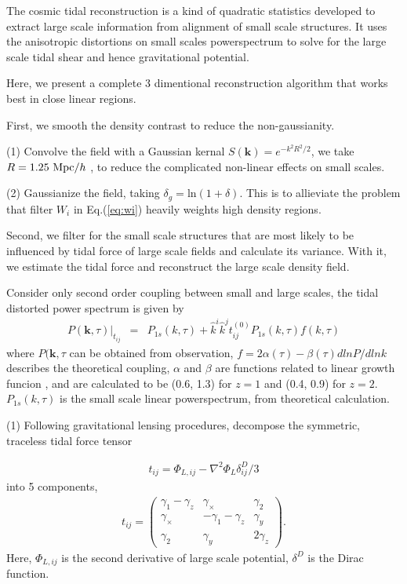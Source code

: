 The cosmic tidal reconstruction is a kind of quadratic statistics developed to extract large scale information from alignment of small scale structures.
It uses the anisotropic distortions on small scales powerspectrum to solve for the large scale tidal shear and hence gravitational potential.

Here, we present a complete 3 dimentional reconstruction algorithm that works best in close linear regions.

First, we smooth the density contrast to reduce the non-gaussianity.

(1) Convolve the field with a Gaussian kernal
$S(\bm{k})=e^{-k^2R^2/2}$, 
we take $R=1.25\ \mathrm{Mpc}/h$ \cite{2012:pen},
to reduce the complicated non-linear effects on small scales.

(2) Gaussianize the field, taking 
$\delta_g=\mathrm{ln}(1+\delta)$. 
This is to allieviate the problem that filter $W_i$ in Eq.(\ref{eq:wi}) heavily weights high density regions.


Second, we filter for the small scale structures that are most likely to be influenced by tidal force of large scale fields and calculate its variance. 
With it, we estimate the tidal force and reconstruct the large scale density field.

Consider only second order coupling between small and large scales,  
the tidal distorted power spectrum \cite{2015:zhu} is given by
\begin{eqnarray}
\label{eq:powerdistort}
P(\bm{k},\tau)|_{t_{ij}}&=&P_{1s}(k,\tau)+
\hat{k}^i\hat{k}^jt_{ij}^{(0)}P_{1s}(k,\tau)f(k,\tau)
\end{eqnarray}
where $P(\bm{k},\tau$ can be obtained from observation, 
$f=2\alpha(\tau)-\beta(\tau)dlnP/dlnk$ describes the theoretical coupling, 
$\alpha$ and $\beta$ are functions related to linear growth funcion \cite{2015:zhu}, 
and are calculated to be (0.6, 1.3) for $z=1$ and (0.4, 0.9) for $z=2$.
$P_{1s}(k,\tau)$ is the small scale linear powerspectrum, 
from theoretical calculation.

(1) Following gravitational lensing procedures, decompose the symmetric, traceless tidal force tensor 

\begin{eqnarray}
\label{eq:tij}
t_{ij}=\Phi_{L,ij}-\nabla^2\Phi_L\delta^D_{ij}/3
\end{eqnarray}
into 5 components, 
\begin{eqnarray}
t_{ij}=\left( \begin{array}{ccc}
\gamma_{1}-\gamma_{z} & \gamma_{\times} & \gamma_{2}\\
\gamma_{\times} & -\gamma_{1}-\gamma_{z} & \gamma_{y}\\
\gamma_{2} & \gamma_{y} & 2\gamma_z
\end{array} \right).
\end{eqnarray}
Here, $\Phi_{L,ij}$ is the second derivative of large scale potential, 
$\delta^D$ is the Dirac function.


